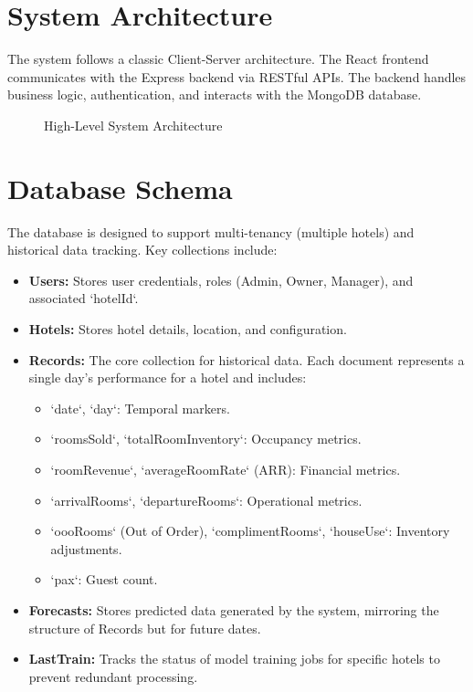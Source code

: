 \documentclass[letterpaper,11pt]{report}
\begin{document}
\section{System Architecture}
The system follows a classic Client-Server architecture. The React frontend communicates with the Express backend via RESTful APIs. The backend handles business logic, authentication, and interacts with the MongoDB database.

\begin{figure}[h]
    \centering
    \caption{High-Level System Architecture}
    \label{fig:architecture}
\end{figure}

\section{Database Schema}
The database is designed to support multi-tenancy (multiple hotels) and historical data tracking. Key collections include:

\begin{itemize}
    \item \textbf{Users:} Stores user credentials, roles (Admin, Owner, Manager), and associated `hotelId`.
    \item \textbf{Hotels:} Stores hotel details, location, and configuration.
    \item \textbf{Records:} The core collection for historical data. Each document represents a single day's performance for a hotel and includes:
    \begin{itemize}
        \item `date`, `day`: Temporal markers.
        \item `roomsSold`, `totalRoomInventory`: Occupancy metrics.
        \item `roomRevenue`, `averageRoomRate` (ARR): Financial metrics.
        \item `arrivalRooms`, `departureRooms`: Operational metrics.
        \item `oooRooms` (Out of Order), `complimentRooms`, `houseUse`: Inventory adjustments.
        \item `pax`: Guest count.
    \end{itemize}
    \item \textbf{Forecasts:} Stores predicted data generated by the system, mirroring the structure of Records but for future dates.
    \item \textbf{LastTrain:} Tracks the status of model training jobs for specific hotels to prevent redundant processing.
\end{itemize}
\end{document}
